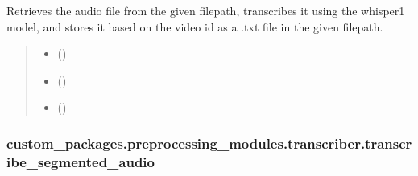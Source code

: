 \documentclass[letterpaper,10pt,english]{sphinxhowto}
\begin{document}
\begin{fulllineitems}
\label{\detokenize{_autosummary/custom_packages.preprocessing_modules.transcriber.transcribe_audio:custom_packages.preprocessing_modules.transcriber.transcribe_audio}}
\pysigstartsignatures
\pysiglinewithargsret
{}
{\sphinxparamcomma {}\sphinxparamcomma {}}
{}
\pysigstopsignatures
\sphinxAtStartPar
Retrieves the audio file from the given filepath, transcribes it using the whisper\sphinxhyphen{}1 model,
and stores it based on the video id as a .txt file in the given filepath.
\begin{quote}\begin{description}
\begin{itemize}
\item {} 
\sphinxAtStartPar
{} ()

\item {} 
\sphinxAtStartPar
{} ()

\item {} 
\sphinxAtStartPar
{} ()

\end{itemize}

\sphinxAtStartPar
{}

\end{description}\end{quote}

\end{fulllineitems}


\sphinxstepscope


\subsubsection{custom\_packages.preprocessing\_modules.transcriber.transcribe\_segmented\_audio}
\label{\detokenize{_autosummary/custom_packages.preprocessing_modules.transcriber.transcribe_segmented_audio:custom-packages-preprocessing-modules-transcriber-transcribe-segmented-audio}}\label{\detokenize{_autosummary/custom_packages.preprocessing_modules.transcriber.transcribe_segmented_audio::doc}}
\end{document}
